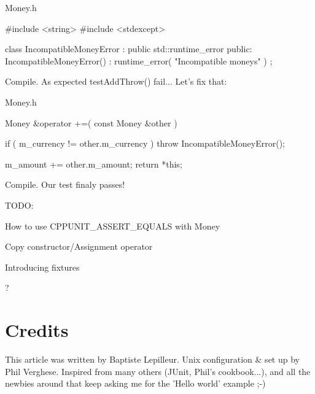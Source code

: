 {\ttfamily Money.h} 
\begin{DoxyCode}
#include <string>
#include <stdexcept>

class IncompatibleMoneyError : public std::runtime_error
{
public:
  IncompatibleMoneyError() : runtime_error( "Incompatible moneys" )
  {
  }
};
\end{DoxyCode}


Compile. As expected testAddThrow() fail... Let's fix that:

{\ttfamily Money.h} 
\begin{DoxyCode}
  Money &operator +=( const Money &other )
  {
    if ( m_currency != other.m_currency )
      throw IncompatibleMoneyError();

    m_amount += other.m_amount;
    return *this;
  }
\end{DoxyCode}


Compile. Our test finaly passes!

TODO:
\begin{DoxyItemize}
\item How to use CPPUNIT\_\-ASSERT\_\-EQUALS with Money
\item Copy constructor/Assignment operator
\item Introducing fixtures
\item ?
\end{DoxyItemize}\hypertarget{money_example_sec_credits}{}\section{Credits}\label{money_example_sec_credits}
This article was written by Baptiste Lepilleur. Unix configuration \& set up by Phil Verghese. Inspired from many others (JUnit, Phil's cookbook...), and all the newbies around that keep asking me for the 'Hello world' example ;-\/) 